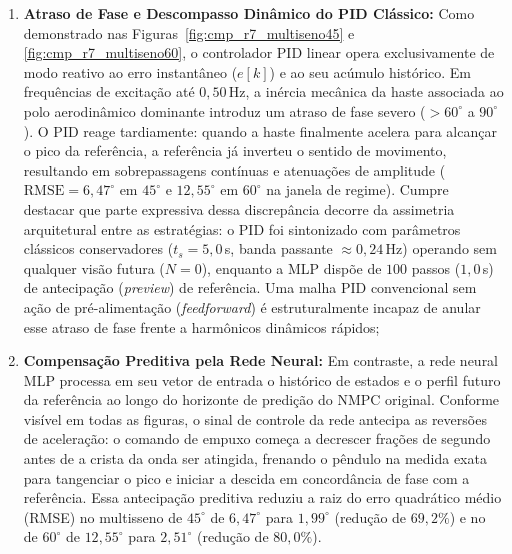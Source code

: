 \begin{enumerate}
    \item \textbf{Atraso de Fase e Descompasso Dinâmico do PID Clássico:} Como demonstrado nas Figuras~\ref{fig:cmp_r7_multiseno45} e \ref{fig:cmp_r7_multiseno60}, o controlador PID linear opera exclusivamente de modo reativo ao erro instantâneo ($e[k]$) e ao seu acúmulo histórico. Em frequências de excitação até $0{,}50$\,Hz, a inércia mecânica da haste associada ao polo aerodinâmico dominante introduz um atraso de fase severo ($> 60^\circ$ a $90^\circ$). O PID reage tardiamente: quando a haste finalmente acelera para alcançar o pico da referência, a referência já inverteu o sentido de movimento, resultando em sobrepassagens contínuas e atenuações de amplitude ($\text{RMSE} = 6{,}47^\circ$ em $45^\circ$ e $12{,}55^\circ$ em $60^\circ$ na janela de regime). Cumpre destacar que parte expressiva dessa discrepância decorre da assimetria arquitetural entre as estratégias: o PID foi sintonizado com parâmetros clássicos conservadores ($t_s = 5{,}0$\,s, banda passante $\approx 0{,}24$\,Hz) operando sem qualquer visão futura ($N=0$), enquanto a MLP dispõe de $100$ passos ($1{,}0$\,s) de antecipação (\textit{preview}) de referência. Uma malha PID convencional sem ação de pré-alimentação (\textit{feedforward}) é estruturalmente incapaz de anular esse atraso de fase frente a harmônicos dinâmicos rápidos;
    
    \item \textbf{Compensação Preditiva pela Rede Neural:} Em contraste, a rede neural MLP processa em seu vetor de entrada o histórico de estados e o perfil futuro da referência ao longo do horizonte de predição do NMPC original. Conforme visível em todas as figuras, o sinal de controle da rede antecipa as reversões de aceleração: o comando de empuxo começa a decrescer frações de segundo antes de a crista da onda ser atingida, frenando o pêndulo na medida exata para tangenciar o pico e iniciar a descida em concordância de fase com a referência. Essa antecipação preditiva reduziu a raiz do erro quadrático médio (RMSE) no multisseno de $45^\circ$ de $6{,}47^\circ$ para ${1{,}99^\circ}$ (redução de ${69{,}2\%}$) e no de $60^\circ$ de $12{,}55^\circ$ para ${2{,}51^\circ}$ (redução de ${80{,}0\%}$).
    

\end{enumerate}

